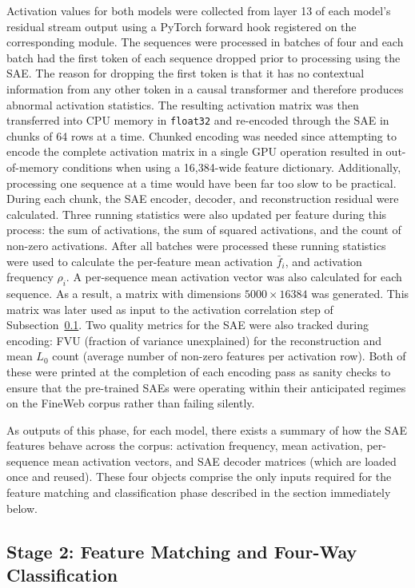 Activation values for both models were collected from layer 13 of each model's residual stream output using a PyTorch forward hook registered on the corresponding  module. The sequences were processed in batches of four and each batch had the first token of each sequence dropped prior to processing using the SAE. The reason for dropping the first token is that it has no contextual information from any other token in a causal transformer and therefore produces abnormal activation statistics. The resulting activation matrix was then transferred into CPU memory in \texttt{float32} and re-encoded through the SAE in chunks of 64 rows at a time. Chunked encoding was needed since attempting to encode the complete activation matrix in a single GPU operation resulted in out-of-memory conditions when using a 16,384-wide feature dictionary. Additionally, processing one sequence at a time would have been far too slow to be practical. During each chunk, the SAE encoder, decoder, and reconstruction residual were calculated. Three running statistics were also updated per feature during this process: the sum of activations, the sum of squared activations, and the count of non-zero activations. After all batches were processed these running statistics were used to calculate the per-feature mean activation $\bar{f}_i$, and activation frequency $\rho_i$. A per-sequence mean activation vector was also calculated for each sequence. As a result, a matrix with dimensions $5000 \times 16384$ was generated. This matrix was later used as input to the activation correlation step of Subsection~\ref{subsec:feature-matching-classification}. Two quality metrics for the SAE were also tracked during encoding: FVU (fraction of variance unexplained) for the reconstruction and mean $L_0$ count (average number of non-zero features per activation row). Both of these were printed at the completion of each encoding pass as sanity checks to ensure that the pre-trained SAEs were operating within their anticipated regimes on the FineWeb corpus rather than failing silently.

As outputs of this phase, for each model, there exists a summary of how the SAE features behave across the corpus: activation frequency, mean activation, per-sequence mean activation vectors, and SAE decoder matrices (which are loaded once and reused). These four objects comprise the only inputs required for the feature matching and classification phase described in the section immediately below.

\subsection{Stage 2: Feature Matching and Four-Way Classification}
\label{subsec:feature-matching-classification}

